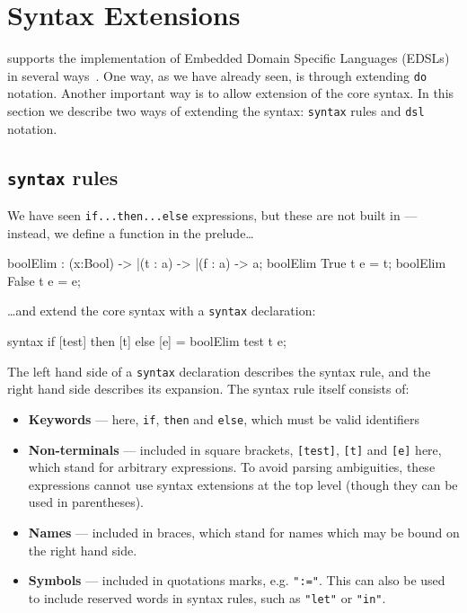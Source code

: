 \section{Syntax Extensions}

\Idris{} supports the implementation of Embedded Domain Specific Languages (EDSLs) in
several ways~\cite{res-dsl-padl12}. One way, as we have already seen, is through
extending \texttt{do} notation. Another important way is to allow extension of the core
syntax. In this section we describe two ways of extending the syntax: \texttt{syntax}
rules and \texttt{dsl} notation.

\subsection{\texttt{syntax} rules}

We have seen \texttt{if...then...else} expressions, but these
are not built in --- instead, we define a function in the prelude\ldots

\begin{code}
boolElim : (x:Bool) -> |(t : a) -> |(f : a) -> a; 
boolElim True  t e = t;
boolElim False t e = e;
\end{code}

\noindent
\ldots and extend the core syntax with a \texttt{syntax} declaration:

\begin{code}
syntax if [test] then [t] else [e] = boolElim test t e;
\end{code}

\noindent
The left hand side of a \texttt{syntax} declaration describes the syntax rule, and the right
hand side describes its expansion. The syntax rule itself consists of:

\begin{itemize}
\item \textbf{Keywords} --- here, \texttt{if}, \texttt{then} and \texttt{else}, which must
be valid identifiers
\item \textbf{Non-terminals} --- included in square brackets, \texttt{[test]}, \texttt{[t]}
and \texttt{[e]} here, which stand for arbitrary expressions. To avoid parsing ambiguities, 
these expressions cannot use syntax extensions at the top level (though they can be used
in parentheses).
\item \textbf{Names} --- included in braces, which stand for names which may be bound
on the right hand side.
\item \textbf{Symbols} --- included in quotations marks, e.g. \texttt{":="}. This can
also be used to include reserved words in syntax rules, such as \texttt{"let"} or \texttt{"in"}.
\end{itemize}

